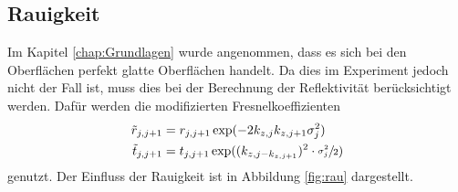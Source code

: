 \subsection{Rauigkeit}
Im Kapitel \ref{chap:Grundlagen} wurde angenommen, dass es sich bei den Oberflächen perfekt glatte Oberflächen handelt. Da dies im Experiment jedoch nicht der Fall ist, muss dies bei der Berechnung der Reflektivität berücksichtigt werden. 
Dafür werden die modifizierten Fresnelkoeffizienten
\begin{align}
    \tilde{r}_{j,j+1}&=r_{j,j+1}\exp(-2k_{z,j}k_{z,j+1}\sigma^2_j)\\
    \tilde{t}_{j,j+1}&=t_{j,j+1}\exp((k_{z,j-k_{z,j+1}})^2\cdot\sfrac{\sigma^2_j}{2})
\end{align} 
genutzt. Der Einfluss der Rauigkeit ist in Abbildung \ref{fig:rau} dargestellt. 